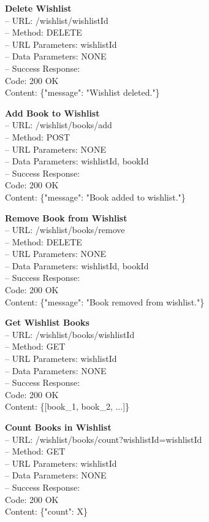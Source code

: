 \textbf{Delete Wishlist} \\
– URL: /wishlist/{wishlistId} \\
– Method: DELETE \\
– URL Parameters: wishlistId \\
– Data Parameters: NONE \\
– Success Response: \\
Code: 200 OK \\
Content: \{"message": "Wishlist deleted."\}

\textbf{Add Book to Wishlist} \\
– URL: /wishlist/books/add \\
– Method: POST \\
– URL Parameters: NONE \\
– Data Parameters: wishlistId, bookId \\
– Success Response: \\
Code: 200 OK \\
Content: \{"message": "Book added to wishlist."\}

\textbf{Remove Book from Wishlist} \\
– URL: /wishlist/books/remove \\
– Method: DELETE \\
– URL Parameters: NONE \\
– Data Parameters: wishlistId, bookId \\
– Success Response: \\
Code: 200 OK \\
Content: \{"message": "Book removed from wishlist."\}

\textbf{Get Wishlist Books} \\
– URL: /wishlist/books/{wishlistId} \\
– Method: GET \\
– URL Parameters: wishlistId \\
– Data Parameters: NONE \\
– Success Response: \\
Code: 200 OK \\
Content: \{[book\_1, book\_2, ...]\}

\textbf{Count Books in Wishlist} \\
– URL: /wishlist/books/count?wishlistId={wishlistId} \\
– Method: GET \\
– URL Parameters: wishlistId \\
– Data Parameters: NONE \\
– Success Response: \\
Code: 200 OK \\
Content: \{"count": X\}

